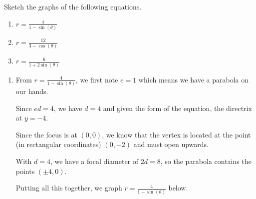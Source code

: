 \documentclass{ximera}
\begin{document}
\begin{example}  \label{polarconicgraphex}  Sketch the graphs of the following equations.

\begin{enumerate}

\item  \label{polarparabola} $r  = \frac{4}{1-\sin(\theta)}$

\item  $r = \frac{12}{3 - \cos(\theta)}$  

\item  $r = \frac{6}{1 + 2\sin(\theta)}$


\end{enumerate}



\begin{explanation} \begin{enumerate}  \item From $r  = \frac{4}{1-\sin(\theta)}$, we first note $e =1$ which means we have a parabola on our hands.  

 

Since $ed = 4$, we have $d=4$ and given the form of the equation, the directrix at $y = -4$.  

 

Since the focus is at $(0,0)$, we know that the vertex is located at the point (in rectangular coordinates) $(0,-2)$ and must open upwards.  

 

With $d=4$, we have a focal diameter of $2d = 8$, so the parabola contains the points $(\pm 4, 0)$.  

 

Putting all this together, we graph  $r  = \frac{4}{1-\sin(\theta)}$ below.

\begin{image}
\end{image}
\end{enumerate}
\end{explanation}
\end{example}
\end{document}
